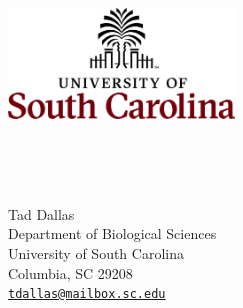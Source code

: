\documentclass[12pt]{article}
\newcommand{\email}[1]{\href{mailto:#1}{\tt \textcolor{cornflower}{#1}}}
\begin{document}
\begin{minipage}[c]{8in}\vskip-2cm
\begin{flushleft}
	\begin{minipage}[c]{6cm}
		\begin{flushleft}
			\includegraphics*[width=6cm]{usc.jpg}%
		\end{flushleft}
	\end{minipage}
	\,\,
	\begin{minipage}[c]{0.25cm}
		\vrule depth 0.1\textheight
	\end{minipage}
	\,
	\begin{minipage}[c]{8cm}
		\footnotesize
		{\sffamily
			Tad Dallas \\
			Department of Biological Sciences \\
			University of South Carolina\\
			Columbia, SC 29208 \\
			\email{tdallas@mailbox.sc.edu}
		}
	\end{minipage}
\end{flushleft}
\end{minipage}
\end{document}
